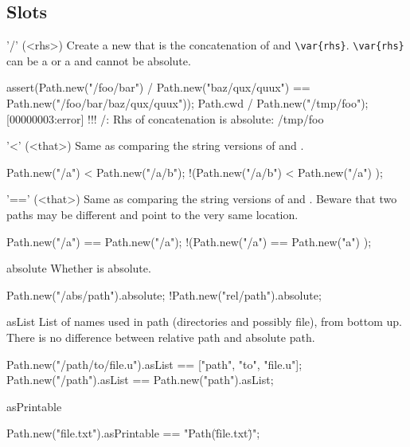 \subsection{Slots}
\begin{urbiscriptapi}
\item['/'](<rhs>)%
  Create a new  that is the concatenation of
  \this and \lstinline|\var{rhs}|. \lstinline|\var{rhs}|
  can be a  or a  and cannot be absolute.
\begin{urbiscript}
assert(Path.new("/foo/bar") / Path.new("baz/qux/quux")
       == Path.new("/foo/bar/baz/qux/quux"));
Path.cwd / Path.new("/tmp/foo");
[00000003:error] !!! /: Rhs of concatenation is absolute: /tmp/foo
\end{urbiscript}


\item['<'](<that>)%
  Same as comparing the string versions of \this and
  .
\begin{urbiassert}
  Path.new("/a")   < Path.new("/a/b");
!(Path.new("/a/b") < Path.new("/a")  );
\end{urbiassert}


\item['=='](<that>)%
  Same as comparing the string versions of \this and
  .  Beware that two paths may be different and point to the
  very same location.
\begin{urbiassert}
  Path.new("/a")  == Path.new("/a");
!(Path.new("/a")  == Path.new("a")  );
\end{urbiassert}


\item[absolute]
  Whether \this is absolute.
\begin{urbiassert}
Path.new("/abs/path").absolute;
!Path.new("rel/path").absolute;
\end{urbiassert}


\item[asList]
  List of names used in path (directories and possibly file), from
  bottom up. There is no difference between relative path and absolute
  path.
\begin{urbiassert}
Path.new("/path/to/file.u").asList == ["path", "to", "file.u"];
Path.new("/path").asList           == Path.new("path").asList;
\end{urbiassert}


\item[asPrintable]
\begin{urbiassert}
Path.new("file.txt").asPrintable == "Path(\"file.txt\")";
\end{urbiassert}



\end{urbiscriptapi}
